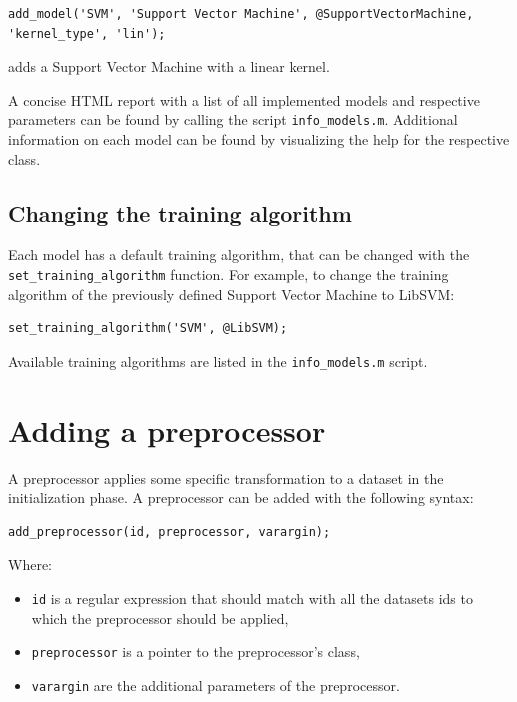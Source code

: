 \begin{lstlisting}
add_model('SVM', 'Support Vector Machine', @SupportVectorMachine, 'kernel_type', 'lin');
\end{lstlisting}

\noindent adds a Support Vector Machine with a linear kernel.

A concise HTML report with a list of all implemented models and respective parameters can be found by calling the script \verb|info_models.m|. Additional information on each model can be found by visualizing the help for the respective class.

\subsection{Changing the training algorithm}

Each model has a default training algorithm, that can be changed with the \verb|set_training_algorithm| function. For example, to change the training algorithm of the previously defined Support Vector Machine to LibSVM:

\begin{lstlisting}
set_training_algorithm('SVM', @LibSVM); 
\end{lstlisting}

\noindent Available training algorithms are listed in the \verb|info_models.m| script.

\section{Adding a preprocessor}

A preprocessor applies some specific transformation to a dataset in the initialization phase. A preprocessor can be added with the following syntax:

\begin{lstlisting}
add_preprocessor(id, preprocessor, varargin);
\end{lstlisting}

\noindent Where:

\begin{itemize}
\item \verb|id| is a regular expression that should match with all the datasets ids to which the preprocessor should be applied,
\item \verb|preprocessor| is a pointer to the preprocessor's class,
\item \verb|varargin| are the additional parameters of the preprocessor.
\end{itemize}

